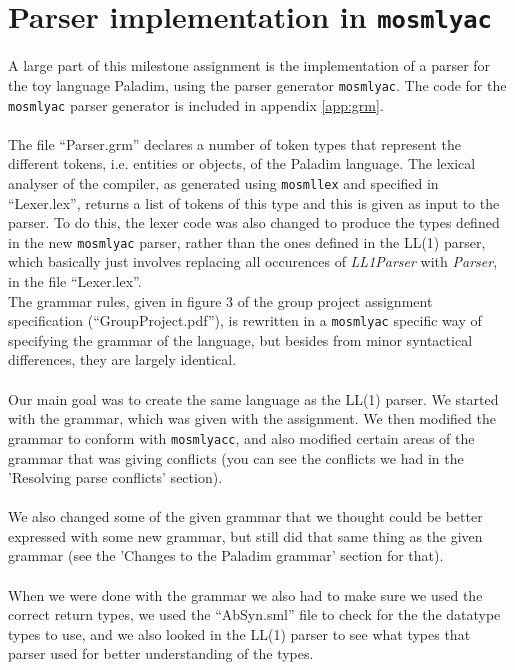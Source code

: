 \documentclass[12pt,a4paper]{article}
\begin{document}
\section{Parser implementation in \texttt{mosmlyac}}
A large part of this milestone assignment is the implementation of a parser for
the toy language \textsf{Paladim}, using the parser generator \texttt{mosmlyac}.
The code for the \texttt{mosmlyac} parser generator is included in appendix
\ref{app:grm}.\\
\\
The file ``Parser.grm'' declares a number of token types that represent the
different tokens, i.e. entities or objects, of the \textsf{Paladim} language.
The lexical analyser of the compiler, as generated using \texttt{mosmllex} and
specified in ``Lexer.lex'', returns a list of tokens of this type and this is
given as input to the parser. To do this, the lexer code was also changed to
produce the types defined in the new \texttt{mosmlyac} parser, rather than the
ones defined in the LL(1) parser, which basically just involves replacing all
occurences of \emph{LL1Parser} with \emph{Parser}, in the file ``Lexer.lex''.\\
The grammar rules, given in figure 3 of the group project assignment
specification (``GroupProject.pdf''), is rewritten in a \texttt{mosmlyac}
specific way of specifying the grammar of the language, but besides from minor
syntactical differences, they are largely identical.\\
\\
Our main goal was to create the same language as the LL(1) parser. We started
with the grammar, which was given with the assignment. We then modified the
grammar to conform with \texttt{mosmlyacc}, and also modified certain areas of
the grammar that was giving conflicts (you can see the conflicts we had in the
'Resolving parse conflicts' section).\\
\\
We also changed some of the given grammar that we thought could be better
expressed with some new grammar, but still did that same thing as the given
grammar (see the 'Changes to the \textsf{Paladim} grammar' section for that).\\
\\
When we were done with the grammar we also had to make sure we used the correct
return types, we used the ``AbSyn.sml'' file to check for the the datatype types
to use, and we also looked in the LL(1) parser to see what types that parser
used for better understanding of the types.
\end{document}

